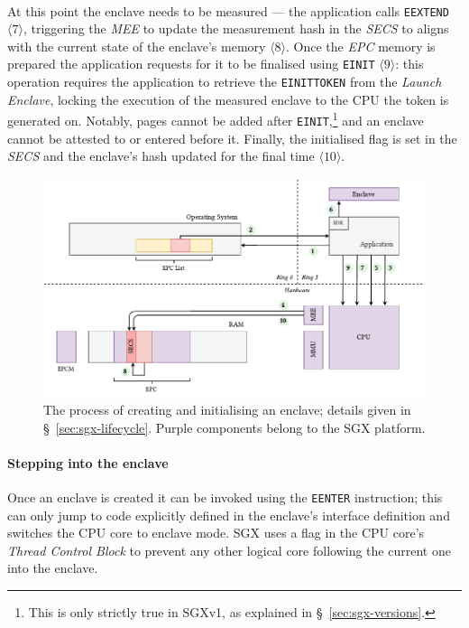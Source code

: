 \paragraph{} At this point the enclave needs to be measured --- the application calls \texttt{EEXTEND} $\langle 7 \rangle$, triggering the \textit{MEE} to update the measurement hash in the \textit{SECS} to aligns with the current state of the enclave's memory $\langle 8 \rangle$. Once the \textit{EPC} memory is prepared the application requests for it to be finalised using \texttt{EINIT} $\langle 9 \rangle$: this operation requires the application to retrieve the \texttt{EINITTOKEN} from the \textit{Launch Enclave}, locking the execution of the measured enclave to the CPU the token is generated on. Notably, pages cannot be added after \texttt{EINIT},\footnote{This is only strictly true in SGXv1, as explained in §~\ref{sec:sgx-versions}.} and an enclave cannot be attested to or entered before it. Finally, the initialised flag is set in the \textit{SECS} and the enclave's hash updated for the final time $\langle 10 \rangle$.


\begin{figure}[]
    \centering
    \includegraphics[width=\linewidth]{figures/SGX-EnclaveCreate.pdf}
    \captionsetup{justification=centering}
    \caption[The process of creating and initialising an enclave.]{The process of creating and initialising an enclave; details given in §~\ref{sec:sgx-lifecycle}. Purple components belong to the SGX platform.}
    \label{fig:sgx-enclavecreate}
\end{figure}

\paragraph{Stepping into the enclave} Once an enclave is created it can be invoked using the \texttt{EENTER} instruction; this can only jump to code explicitly defined in the enclave's interface definition and switches the CPU core to enclave mode. SGX uses a flag in the CPU core's \textit{Thread Control Block} to prevent any other logical core following the current one into the enclave.

